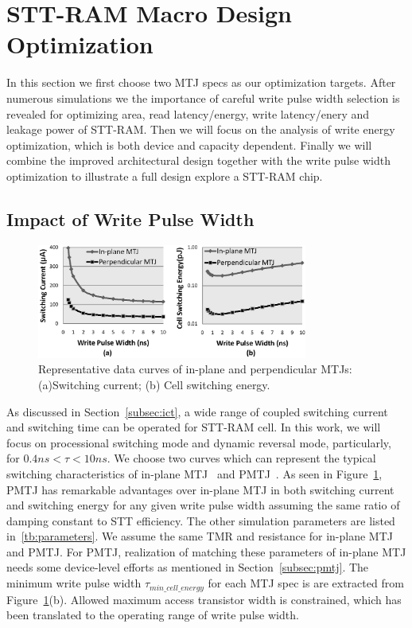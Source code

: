 \section{STT-RAM Macro Design Optimization} \label{sec:opt}
In this section we first choose two MTJ specs as our optimization targets. After numerous simulations we the importance of careful write pulse width selection is revealed for optimizing area, read latency/energy, write latency/enery and leakage power of STT-RAM. Then we will focus on the analysis of write energy optimization, which is both device and capacity dependent. Finally we will combine the improved architectural design together with the write pulse width optimization to illustrate a full design explore a STT-RAM chip.

\subsection{Impact of Write Pulse Width}

\begin{figure}[t]
  \centering
  \includegraphics[width=3.5in]{fig/MTJSpec.eps}
  \vspace{-10pt}
  \caption{Representative data curves of in-plane and perpendicular MTJs: (a)Switching current; (b) Cell switching energy.}
  \label{fig:specs}
  \vspace{-15pt}
\end{figure}

As discussed in Section~\ref{subsec:ict}, a wide range of coupled switching current and switching time can be operated for STT-RAM cell. In this work, we will focus on processional switching mode and dynamic reversal mode, particularly, for $0.4ns < \tau < 10ns$. We choose two curves which can represent the typical switching characteristics of in-plane MTJ~\cite{STTRAM:Qualcomm09} and PMTJ~\cite{PMTJ:Toshiba08}. As seen in Figure~\ref{fig:specs}, PMTJ has remarkable advantages over in-plane MTJ in both switching current and switching energy for any given write pulse width assuming the same ratio of damping constant to STT efficiency. The other simulation parameters are listed in~\ref{tb:parameters}. We assume the same TMR and resistance for in-plane MTJ and PMTJ. For PMTJ, realization of matching these parameters of in-plane MTJ needs some device-level efforts as mentioned in Section~\ref{subsec:pmtj}. The minimum write pulse width $\tau_{min\_cell\_energy}$ for each MTJ spec is are extracted from Figure~\ref{fig:specs}(b). Allowed maximum access transistor width is constrained, which has been translated to the operating range of write pulse width.

